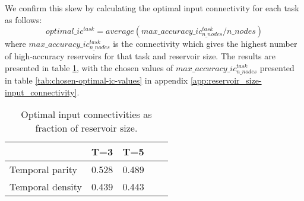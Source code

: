 \begin{figure*}[ht]
    \centering
    \resizebox{\textwidth}{!}{
        \subfloat[N=10]{
            
        }
        \subfloat[N=80]{
            
        }
    }
    \resizebox{\textwidth}{!}{
        \subfloat[N=20]{
            
        }
        \subfloat[N=90]{
            
        }
    }
    \resizebox{\textwidth}{!}{
        \subfloat[N=30]{
            
        }
        \subfloat[N=100]{
            
        }
    }
    \caption[Abridged plots for input connectivity against accuracy for temporal parity 3]{
        Plots of input connectivity against accuracy on TP3. Reservoir sizes $[40..70]$ are omitted for brevity.
        Note that the optimal input connectivity tends slightly to the right of the middle for all reservoir sizes.
        The omitted plots are presented in figures \ref{fig:TP3-IC-1} and \ref{fig:TP3-IC-2} in appendix \ref{app:reservoir_size-input_connectivity}.
        }
    \label{fig:TP3-IC}
\end{figure*}

We confirm this skew by calculating the optimal input connectivity for each task as follows:
\begin{equation} \label{eq:optimal-ic}
optimal\_ic^{task} = average(max\_accuracy\_ic_{n\_nodes}^{task} / n\_nodes)
\end{equation}
where $ max\_accuracy\_ic_{n\_nodes}^{task} $ is the connectivity which gives the highest number of high-accuracy reservoirs for that task and reservoir size.
The results are presented in table \ref{tab:optimal-ic},
with the chosen values of $ max\_accuracy\_ic_{n\_nodes}^{task} $ presented in table \ref{tab:chosen-optimal-ic-values} in appendix \ref{app:reservoir_size-input_connectivity}.

\begin{table}
    \centering
    \caption{Optimal input connectivities as fraction of reservoir size.}
    \label{tab:optimal-ic}
    \begin{tabular}{lllll}
        \hline
        \hline
                         & \textbf{T=3} & \textbf{T=5} \\
        \hline
        Temporal parity  & 0.528          & 0.489 \\
        Temporal density & 0.439          & 0.443 \\
        \hline
    \end{tabular}
\end{table}

